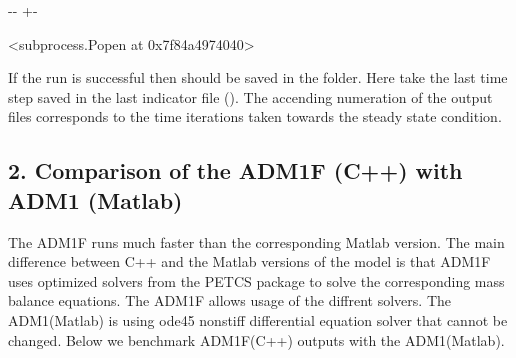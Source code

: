 \documentclass[a4paper,10pt,english]{sphinxmanual}
\newlength\nbsphinxcodecellspacing
\begin{document}
{
\begin{sphinxVerbatim}[commandchars=\\\{\}]
\llap{\color{nbsphinxin}[6]:\,\hspace{\fboxrule}\hspace{\fboxsep}}
 
\end{sphinxVerbatim}
}

{

\kern-\sphinxverbatimsmallskipamount\kern-\baselineskip
\kern+\FrameHeightAdjust\kern-\fboxrule
\vspace{\nbsphinxcodecellspacing}

\begin{sphinxVerbatim}[commandchars=\\\{\}]
\llap{\color{nbsphinxout}[6]:\,\hspace{\fboxrule}\hspace{\fboxsep}}<subprocess.Popen at 0x7f84a4974040>
\end{sphinxVerbatim}
}

\sphinxAtStartPar
If the run is successful then  should be saved in the  folder. Here take the last time step saved in the last indicator file (). The accending numeration of the output files corresponds to the time iterations taken towards the steady state condition.


\subsection{2. Comparison of the ADM1F (C++) with ADM1 (Matlab)}
\label{\detokenize{jupyter_notebook/Steady_State_Run:2.-Comparison-of-the-ADM1F-(C++)-with-ADM1-(Matlab)}}
\sphinxAtStartPar
The ADM1F runs much faster than the corresponding Matlab version. The main difference between C++ and the Matlab versions of the model is that ADM1F uses optimized solvers from the PETCS package to solve the corresponding mass balance equations. The ADM1F allows usage of the diffrent solvers. The ADM1(Matlab) is using ode45 nonstiff differential equation solver that cannot be changed. Below we benchmark ADM1F(C++) outputs with the ADM1(Matlab).
\end{document}
